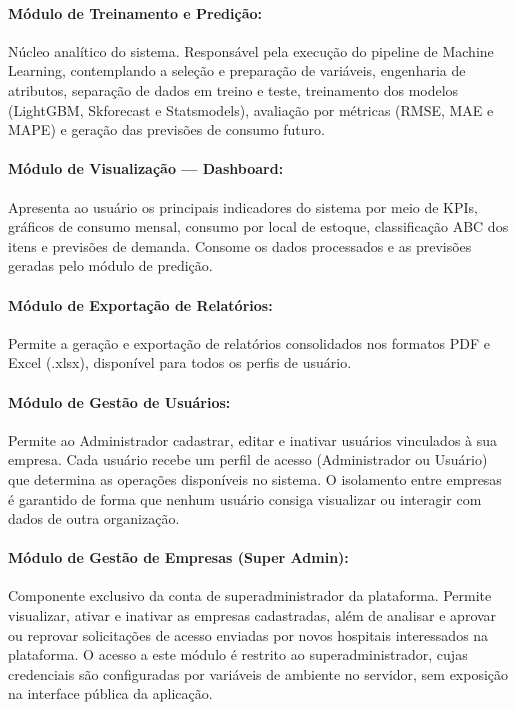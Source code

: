 \documentclass[12pt,a4paper]{article}
\begin{document}
\paragraph{Módulo de Treinamento e Predição:}
Núcleo analítico do sistema. Responsável pela execução do pipeline de
Machine Learning, contemplando a seleção e preparação de variáveis,
engenharia de atributos, separação de dados em treino e teste, treinamento
dos modelos (LightGBM, Skforecast e Statsmodels), avaliação por métricas (RMSE,
MAE e MAPE) e geração das previsões de consumo futuro.

\paragraph{Módulo de Visualização — Dashboard:}
Apresenta ao usuário os principais indicadores do sistema por meio de KPIs,
gráficos de consumo mensal, consumo por local de estoque, classificação ABC
dos itens e previsões de demanda. Consome os dados processados e as
previsões geradas pelo módulo de predição.

\paragraph{Módulo de Exportação de Relatórios:}
Permite a geração e exportação de relatórios consolidados nos formatos PDF
e Excel (.xlsx), disponível para todos os perfis de usuário.

\paragraph{Módulo de Gestão de Usuários:}
Permite ao Administrador cadastrar, editar e inativar usuários vinculados à sua empresa. Cada usuário recebe um perfil de acesso (Administrador ou Usuário) que determina as operações disponíveis no sistema. O isolamento entre empresas é garantido de forma que nenhum usuário consiga visualizar ou interagir com dados de outra organização.

\paragraph{Módulo de Gestão de Empresas (Super Admin):}
Componente exclusivo da conta de superadministrador da plataforma. Permite visualizar, ativar e inativar as empresas cadastradas, além de analisar e aprovar ou reprovar solicitações de acesso enviadas por novos hospitais interessados na plataforma. O acesso a este módulo é restrito ao superadministrador, cujas credenciais são configuradas por variáveis de ambiente no servidor, sem exposição na interface pública da aplicação.
\end{document}
